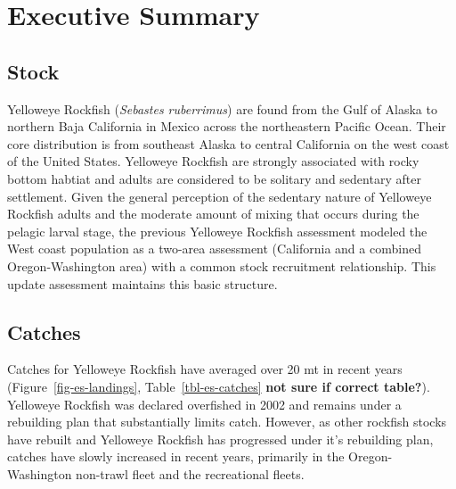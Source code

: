 \documentclass[
]{scrartcl}
\begin{document}
\newpage{}

\section*{Executive Summary}\label{executive-summary}

\subsection*{Stock}\label{stock}

Yelloweye Rockfish (\emph{Sebastes ruberrimus}) are found from the Gulf
of Alaska to northern Baja California in Mexico across the northeastern
Pacific Ocean. Their core distribution is from southeast Alaska to
central California on the west coast of the United States. Yelloweye
Rockfish are strongly associated with rocky bottom habtiat and adults
are considered to be solitary and sedentary after settlement. Given the
general perception of the sedentary nature of Yelloweye Rockfish adults
and the moderate amount of mixing that occurs during the pelagic larval
stage, the previous Yelloweye Rockfish assessment modeled the West coast
population as a two-area assessment (California and a combined
Oregon-Washington area) with a common stock recruitment relationship.
This update assessment maintains this basic structure.

\subsection*{Catches}\label{catches}

Catches for Yelloweye Rockfish have averaged over 20 mt in recent years
(Figure~\ref{fig-es-landings}, Table~\ref{tbl-es-catches} \textbf{not
sure if correct table?}). Yelloweye Rockfish was declared overfished in
2002 and remains under a rebuilding plan that substantially limits
catch. However, as other rockfish stocks have rebuilt and Yelloweye
Rockfish has progressed under it's rebuilding plan, catches have slowly
increased in recent years, primarily in the Oregon-Washington non-trawl
fleet and the recreational fleets.

\begingroup
\fontsize{9.0pt}{10.8pt}\selectfont
\end{document}
